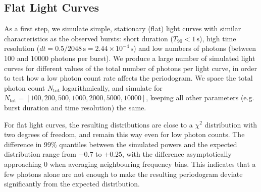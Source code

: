 \documentclass[numberedappendix]{emulateapj}
\begin{document}
\subsection{Flat Light Curves}
\label{sec:analysis_lcsims}
As a first step, we simulate simple, stationary (flat) light curves with similar characteristics as the observed bursts: short duration ($T_{90} < 1 \, \mathrm{s}$), high time resolution ($dt = 0.5/2048 \, \mathrm{s} = 2.44\times 10^{-4} \, \mathrm{s}$) and low numbers of photons (between 100 and 10000 photons per burst). 
We produce a large number of simulated light curves for different values of the total number of photons per light curve, in order to test how a low photon count rate affects the periodogram. We space the total photon count $N_{\mathrm{tot}}$ logarithmically, and simulate for $N_{\mathrm{tot}} = [100, 200, 500, 1000, 2000, 5000, 10000]$, keeping all other parameters (e.g. burst duration and time resolution) the same.

For flat light curves, the resulting distributions are close to a $\chi^2$ distribution with two degrees of freedom, and remain this way even for low photon counts. The difference in $99\%$ quantiles between the simulated powers and the expected distribution range from $-0.7$ to $+0.25$, with the difference asymptotically approaching $0$ when averaging neighbouring frequency bins.
This indicates that a few photons alone are not enough to make the resulting periodogram deviate significantly from the expected distribution.
\end{document}
